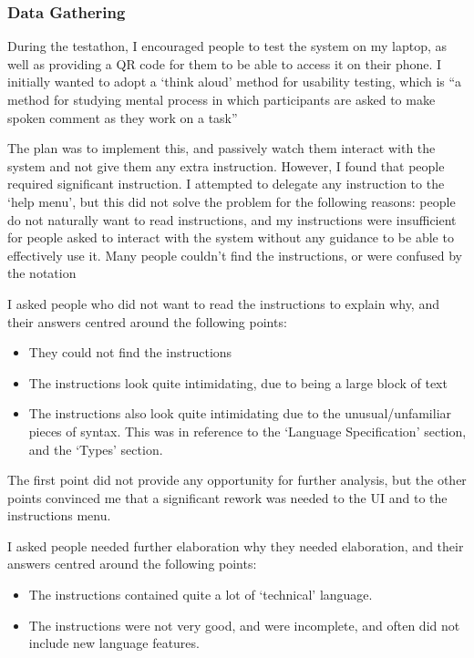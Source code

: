 \subsubsection{Data Gathering}
During the testathon, I encouraged people to test the system on my laptop, as well as providing a QR code for them to be able to access it on their phone. I initially wanted to adopt a `think aloud' method for usability testing, which is ``a method for studying mental process in which participants are asked to make spoken comment as they work on a task''\cite{thinkaloud}

The plan was to implement this, and passively watch them interact with the system and not give them any extra instruction. However, I found that people required significant instruction. I attempted to delegate any instruction to the `help menu', but this did not solve the problem for the following reasons: people do not naturally want to read instructions, and my instructions were insufficient for people asked to interact with the system without any guidance to be able to effectively use it. Many people couldn't find the instructions, or were confused by the notation

I asked people who did not want to read the instructions to explain why, and their answers centred around the following points:
\begin{itemize}
    \item They could not find the instructions
    \item The instructions look quite intimidating, due to being a large block of text
    \item The instructions also look quite intimidating due to the unusual/unfamiliar pieces of syntax. This was in reference to the `Language Specification' section, and the `Types' section.
\end{itemize}
The first point did not provide any opportunity for further analysis, but the other points convinced me that a significant rework was needed to the UI and to the instructions menu. 

I asked people needed further elaboration why they needed elaboration, and their answers centred around the following points:
\begin{itemize}
    \item The instructions contained quite a lot of `technical' language.
    \item The instructions were not very good, and were incomplete, and often did not include new language features.
\end{itemize}


